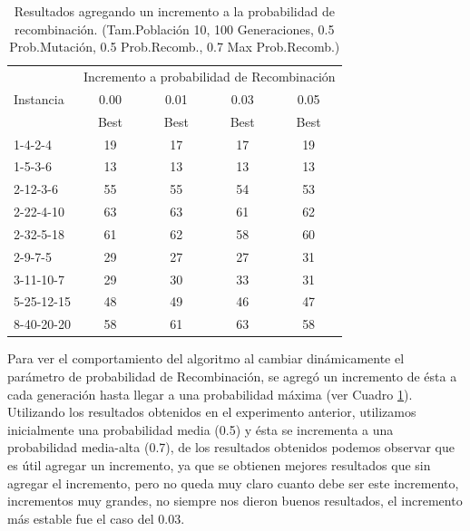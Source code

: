\documentclass[letter, 10pt]{article}
\begin{document}
\begin{table}[]
\centering
\begin{tabular}{l|cccc}
    \hline
                &\multicolumn{4}{c}{Incremento a probabilidad de Recombinación}\\
   Instancia    &0.00 & 0.01 & 0.03 & 0.05\\
                & Best & Best &    Best    &   Best    \\
    \hline
    1-4-2-4     & 19 &  17   & 17  &  19  \\
    1-5-3-6     &  13   &  13 & 13 & 13   \\
    2-12-3-6    &  55   &  55 & 54 & 53  \\
    2-22-4-10   &  63 & 63 & 61 & 62  \\ 
    2-32-5-18   &  61 & 62 & 58 & 60  \\
    2-9-7-5     &  29 & 27 & 27 & 31  \\
    3-11-10-7   &  29 & 30 & 33 & 31  \\
    5-25-12-15  &  48 & 49 & 46 & 47  \\
    8-40-20-20  &  58 & 61 & 63 & 58 
\end{tabular}
\caption{Resultados agregando un incremento a la probabilidad de recombinación. (Tam.Población 10, 100 Generaciones, 0.5 Prob.Mutación, 0.5 Prob.Recomb., 0.7 Max Prob.Recomb.)}
\label{tab:increment}
\end{table}

Para ver el comportamiento del algoritmo al cambiar dinámicamente el parámetro de probabilidad de Recombinación, se agregó un incremento de ésta a cada generación hasta llegar a una probabilidad máxima (ver Cuadro \ref{tab:increment}). Utilizando los resultados obtenidos en el experimento anterior, utilizamos inicialmente una probabilidad media (0.5) y ésta se incrementa a una probabilidad media-alta (0.7), de los resultados obtenidos podemos observar que es útil agregar un incremento, ya que se obtienen mejores resultados que sin agregar el incremento, pero no queda muy claro cuanto debe ser este incremento, incrementos muy grandes, no siempre nos dieron buenos resultados, el incremento más estable fue el caso del 0.03.
\end{document}
